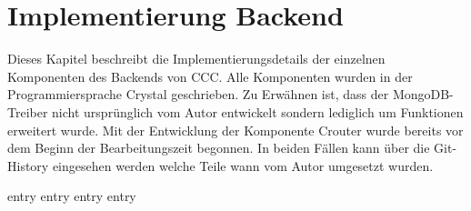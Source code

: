 \chapter{Implementierung Backend}
\label{chap:implementierung_backend}

Dieses Kapitel beschreibt die Implementierungsdetails der einzelnen Komponenten
des Backends von CCC.  Alle Komponenten wurden in der Programmiersprache
Crystal geschrieben.  Zu Erwähnen ist, dass der MongoDB-Treiber nicht
ursprünglich vom Autor entwickelt sondern lediglich um Funktionen erweitert
wurde.  Mit der Entwicklung der Komponente Crouter wurde bereits vor dem Beginn
der Bearbeitungszeit begonnen.  In beiden Fällen kann über die Git-History
eingesehen werden welche Teile wann vom Autor umgesetzt wurden.

{entry}
{entry}
{entry}
{entry}

